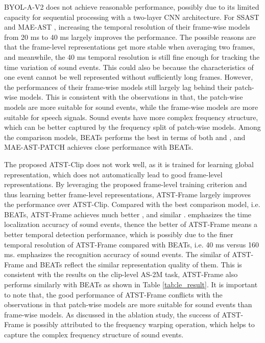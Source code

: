 BYOL-A-V2 does not achieve reasonable performance, possibly due to its limited capacity for sequential processing with a two-layer CNN architecture.
For SSAST \cite{gong_ssast_2022} and MAE-AST \cite{baade_mae-ast_2022}, increasing the temporal resolution of their frame-wise models from 20 ms to 40 ms largely improves the performance. The possible reasons are that the frame-level representations get more stable when averaging two frames, and meanwhile, the 40 ms temporal resolution is still fine enough for tracking the time variation of sound events. This could also be because the characteristics of one event cannot be well represented without sufficiently long frames. However, the performances of their frame-wise models still largely lag behind their patch-wise models. This is consistent with the observations in \cite{gong_ssast_2022,baade_mae-ast_2022} that, the patch-wise models are more suitable for sound events, while the frame-wise models are more suitable for speech signals. Sound events have more complex frequency structure, which can be better captured by the frequency split of patch-wise models. Among the comparison models, BEATs performs the best in terms of both  and , and MAE-AST-PATCH achieves close performance with BEATs. 

The proposed ATST-Clip does not work well, as it is trained for learning global representation, which does not automatically lead to good frame-level representations. By leveraging the proposed frame-level training criterion and thus learning better frame-level representations, ATST-Frame largely improves the performance over ATST-Clip.  Compared with the best comparison model, i.e. BEATs, ATST-Frame achieves much better , and similar . 
 emphasizes the time localization accuracy of sound events, thence the better  of ATST-Frame means a better temporal detection performance, which is possibly due to the finer temporal resolution of ATST-Frame compared with BEATs, i.e. 40 ms versus 160 ms. 
 emphasizes the recognition accuracy of sound events. The similar  of ATST-Frame and BEATs reflect the similar representation quality of them. This is consistent with the results on the clip-level AS-2M task, ATST-Frame also performs similarly with BEATs as shown in Table \ref{tab:le_result}. It is important to note that, the good performance of ATST-Frame conflicts with the observations in \cite{gong_ssast_2022,baade_mae-ast_2022} that patch-wise models are more suitable for sound events than frame-wise models. As discussed in the ablation study, the success of ATST-Frame is possibly attributed to the frequency warping operation, which helps to capture the complex frequency structure of sound events. 








